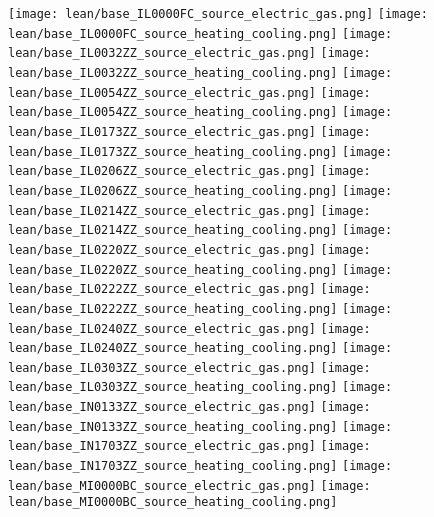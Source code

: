 \texttt{[image: lean/base\_IL0000FC\_source\_electric\_gas.png]}
\texttt{[image: lean/base\_IL0000FC\_source\_heating\_cooling.png]}
\texttt{[image: lean/base\_IL0032ZZ\_source\_electric\_gas.png]}
\texttt{[image: lean/base\_IL0032ZZ\_source\_heating\_cooling.png]}
\texttt{[image: lean/base\_IL0054ZZ\_source\_electric\_gas.png]}
\texttt{[image: lean/base\_IL0054ZZ\_source\_heating\_cooling.png]}
\texttt{[image: lean/base\_IL0173ZZ\_source\_electric\_gas.png]}
\texttt{[image: lean/base\_IL0173ZZ\_source\_heating\_cooling.png]}
\texttt{[image: lean/base\_IL0206ZZ\_source\_electric\_gas.png]}
\texttt{[image: lean/base\_IL0206ZZ\_source\_heating\_cooling.png]}
\texttt{[image: lean/base\_IL0214ZZ\_source\_electric\_gas.png]}
\texttt{[image: lean/base\_IL0214ZZ\_source\_heating\_cooling.png]}
\texttt{[image: lean/base\_IL0220ZZ\_source\_electric\_gas.png]}
\texttt{[image: lean/base\_IL0220ZZ\_source\_heating\_cooling.png]}
\texttt{[image: lean/base\_IL0222ZZ\_source\_electric\_gas.png]}
\texttt{[image: lean/base\_IL0222ZZ\_source\_heating\_cooling.png]}
\texttt{[image: lean/base\_IL0240ZZ\_source\_electric\_gas.png]}
\texttt{[image: lean/base\_IL0240ZZ\_source\_heating\_cooling.png]}
\texttt{[image: lean/base\_IL0303ZZ\_source\_electric\_gas.png]}
\texttt{[image: lean/base\_IL0303ZZ\_source\_heating\_cooling.png]}
\texttt{[image: lean/base\_IN0133ZZ\_source\_electric\_gas.png]}
\texttt{[image: lean/base\_IN0133ZZ\_source\_heating\_cooling.png]}
\texttt{[image: lean/base\_IN1703ZZ\_source\_electric\_gas.png]}
\texttt{[image: lean/base\_IN1703ZZ\_source\_heating\_cooling.png]}
\texttt{[image: lean/base\_MI0000BC\_source\_electric\_gas.png]}
\texttt{[image: lean/base\_MI0000BC\_source\_heating\_cooling.png]}
